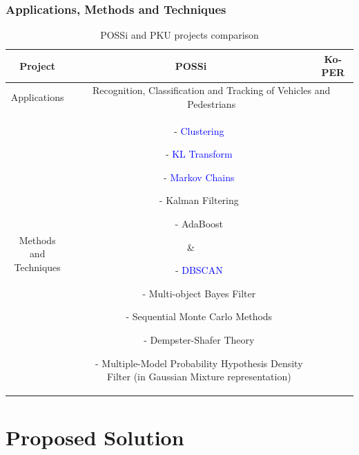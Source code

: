 \documentclass[table]{beamer}
\begin{document}
\frame
{
	\frametitle{Applications, Methods and Techniques}
	
	\scriptsize{
	\begin{table}	
	\begin{tabular}{|c|c|c|}
	\hline
	Project & POSSi & Ko-PER \\
	\hline
	Applications & \multicolumn{2}{c|}{\parbox{6cm}{Recognition, Classification and Tracking of Vehicles and Pedestrians}} \\
	\hline
	\parbox{2.5cm}{Methods and \\Techniques}
	& \parbox{2.5cm}{\begin{itemize}[leftmargin=.07in]
		\item[-] \textcolor{blue}{Clustering}
		\item[-] \textcolor{blue}{KL Transform}
		\item[-] \textcolor{blue}{Markov Chains}
		\item[-] Kalman Filtering
		\item[-] AdaBoost
	\end{itemize}
	}
	& \parbox{3.5cm}{
	\begin{itemize}[leftmargin=.07in]
		\item[-] \textcolor{blue}{DBSCAN}
		\item[-] Multi-object Bayes Filter
		\item[-] Sequential Monte Carlo Methods
		\item[-] Dempster-Shafer Theory
		\item[-] Multiple-Model Probability Hypothesis Density Filter (in Gaussian Mixture representation)
	\end{itemize}
	}\\
	\hline
	
	\end{tabular}
	\caption{POSSi and PKU projects comparison}	
	\end{table}
	}
}

\section{Proposed Solution}
\end{document}
